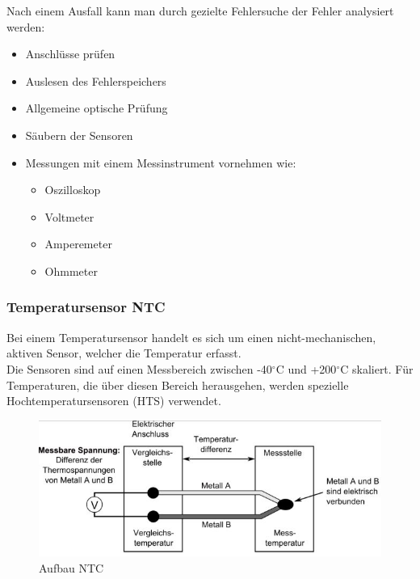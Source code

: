         Nach einem Ausfall kann man durch gezielte Fehlersuche der Fehler analysiert werden:

        \begin{itemize}
            \item Anschlüsse prüfen
            \item Auslesen des Fehlerspeichers
            \item Allgemeine optische Prüfung
            \item Säubern der Sensoren
            \item Messungen mit einem Messinstrument vornehmen wie:
            \begin{itemize}
                \item Oszilloskop 
                \item Voltmeter
                \item Amperemeter
                \item Ohmmeter	
            \end{itemize}
            
        \end{itemize}

        \subsubsection{Temperatursensor NTC}
			Bei einem Temperatursensor handelt es sich um einen nicht-mechanischen, aktiven	Sensor, welcher die Temperatur erfasst.\\
            Die Sensoren sind auf einen Messbereich zwischen -40$^\circ$C und +200$^\circ$C skaliert.
            Für Temperaturen, die über diesen Bereich herausgehen, werden spezielle Hochtemperatursensoren (HTS) verwendet.

            \begin{figure}[h]
			
	        	\includegraphics[width=\textwidth]{aufbau_ntc.png}
	            \caption[www.kfztech.de/kfztechnik/elo/sensoren/ntc.htm]{Aufbau NTC}
	            \label{fig:TS02}
            
			\end{figure}

